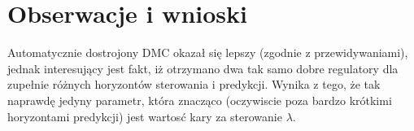 \section{Obserwacje i wnioski}

Automatycznie dostrojony DMC okazał się lepszy (zgodnie z przewidywaniami), jednak interesujący jest fakt, iż otrzymano dwa tak samo dobre regulatory dla zupełnie różnych horyzontów sterowania i predykcji. Wynika z tego, że tak naprawdę jedyny parametr, która znacząco (oczywiscie poza bardzo krótkimi horyzontami predykcji) jest wartosć kary za sterowanie $\lambda$.
